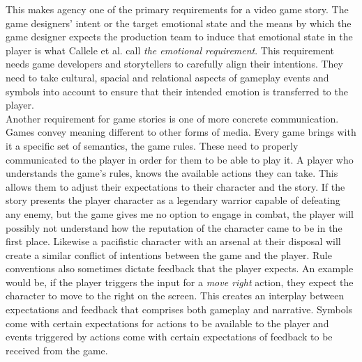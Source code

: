 This makes agency one of the primary requirements for a video game story. The game designers' intent or the target emotional state and the means by which the game designer expects the production team to induce that emotional state in the player is what Callele et al. call \textit{the emotional requirement}. This requirement needs game developers and storytellers to carefully align their intentions. They need to take cultural, spacial and relational aspects of gameplay events and symbols into account to ensure that their intended emotion is transferred to the player.~\cite{Callele2008}\\
Another requirement for game stories is one of more concrete communication. Games convey meaning different to other forms of media. Every game brings with it a specific set of semantics, the game rules. These need to properly communicated to the player in order for them to be able to play it. A player who understands the game's rules, knows the available actions they can take. This allows them to adjust their expectations to their character and the story. If the story presents the player character as a legendary warrior capable of defeating any enemy, but the game gives me no option to engage in combat, the player will possibly not understand how the reputation of the character came to be in the first place. Likewise a pacifistic character with an arsenal at their disposal will create a similar conflict of intentions between the game and the player. Rule conventions also sometimes dictate feedback that the player expects. An example would be, if the player triggers the input for a \textit{move right} action, they expect the character to move to the right on the screen. This creates an interplay between expectations and feedback that comprises both gameplay and narrative. Symbols come with certain expectations for actions to be available to the player and events triggered by actions come with certain expectations of feedback to be received from the game.
